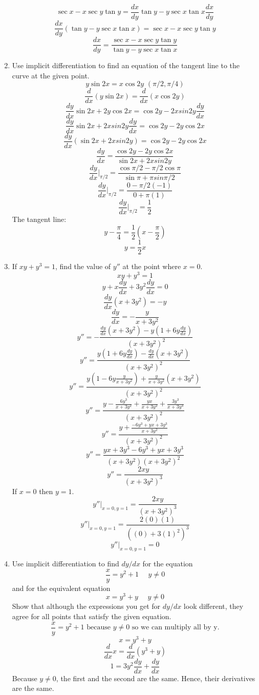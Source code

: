 \documentclass[12pt]{article}
\begin{document}
\begin{enumerate}
    \[\sec x - x \sec y \tan y  = \frac{dx}{dy} \tan y - y \sec x \tan x \frac{dx}{dy} \]
    \[\frac{dx}{dy} (\tan y - y \sec x \tan x)  = \sec x - x \sec y \tan y\]
    \[\boxed{\frac{dx}{dy}  = \frac{\sec x - x \sec y \tan y}{\tan y - y \sec x \tan x}}\]
    \item Use implicit differentiation to find an equation of the tangent line to the curve at the given point.
    \[y \sin2x = x \cos 2y \text{~} (\pi/2, \pi/4)\]
    \[\frac{d}{dx}(y \sin2x) = \frac{d}{dx}(x \cos 2y)\]
    \[\frac{dy}{dx} \sin2x + 2 y \cos2x = \cos2y - 2xsin2y \frac{dy}{dx}\]
    \[\frac{dy}{dx} \sin2x + 2xsin2y \frac{dy}{dx} = \cos2y - 2 y \cos2x\]
    \[\frac{dy}{dx} (\sin2x + 2xsin2y) = \cos2y - 2 y \cos2x\]
    \[\frac{dy}{dx}  = \frac{\cos2y - 2 y \cos2x}{\sin2x + 2xsin2y}\]
    \[\frac{dy}{dx}|_{\pi/2}  = \frac{\cos\pi/2 - \pi/2 \cos\pi}{\sin\pi + \pi sin\pi/2}\]
    \[\frac{dy}{dx}|_{\pi/2}  = \frac{ 0 - \pi/2 (-1)}{0 + \pi(1)}\]
    \[\frac{dy}{dx}|_{\pi/2}  = \frac{1}{2}\]
    The tangent line:
    \[y - \frac{\pi}{4} = \frac{1}{2}(x - \frac{\pi}{2})\]
    \[\boxed{y = \frac{1}{2}x }\]
    \setcounter{enumi}{40}
    \item If $xy + y^3 = 1$, find the value of $y''$ at the point where $x = 0$.
    \[xy + y^3 = 1\]
    \[y + x\frac{dy}{dx} + 3y^2\frac{dy}{dx} = 0\]
    \[\frac{dy}{dx}(x + 3y^2) = -y\]
    \[\frac{dy}{dx} = - \frac{y}{x + 3y^2}\]
    \[y'' = - \frac{\frac{dy}{dx}(x + 3y^2) - y(1 + 6y \frac{dy}{dx})}{(x + 3y^2)^2}\]
    \[y'' = \frac{y(1 + 6y \frac{dy}{dx}) - \frac{dy}{dx}(x + 3y^2) }{(x + 3y^2)^2}\]
    \[y'' = \frac{y(1 - 6y \frac{y}{x + 3y^2}) + \frac{y}{x + 3y^2}(x + 3y^2) }{(x + 3y^2)^2}\]
    \[y'' = \frac{y - \frac{6y^3}{x + 3y^2} + \frac{yx}{x + 3y^2} + \frac{3y^3}{x + 3y^3}}{(x + 3y^2)^2}\]
    \[y'' = \frac{y + \frac{ - 6y^3 + yx + 3y^3}{x + 3y^2}}{(x + 3y^2)^2}\]
    \[y'' = \frac{yx + 3y^3 - 6y^3 + yx + 3y^3}{(x + 3y^2)(x + 3y^2)^2}\]
    \[y'' = \frac{2xy}{(x + 3y^2)^3}\]
    If $x = 0$ then $y = 1$.
    \[y''|_{x = 0, y = 1} = \frac{2xy}{(x + 3y^2)^3}\]
    \[y''|_{x = 0, y = 1} = \frac{2(0)(1)}{((0) + 3(1)^2)^3}\]
    \[\boxed{y''|_{x = 0, y = 1} = 0}\]
    \setcounter{enumi}{62}
    \item Use implicit differentiation to find $dy/dx$ for the equation
    \[\frac{x}{y} = y^2 + 1 \text{~~~~} y \neq 0\]
    and for the equivalent equation
    \[x = y^3 + y \text{~~~~} y \neq 0\]
    Show that although the expressions you get for $dy/dx$ look different, they agree for all points that satisfy the given equation.
    \[\frac{x}{y} = y^2 + 1 \text{ because $y \neq 0$ so we can multiply all by y.} \] 
    \[x = y^3 + y\] 
    \[\frac{d}{dx}x = \frac{d}{dx}(y^3 + y)\] 
    \[\boxed{1 = 3y^2 \frac{dy}{dx} + \frac{dy}{dx}}\]
    Because $y \neq 0$, the first and the second are the same. Hence, their derivatives are the same.
\end{enumerate}
\end{document}

